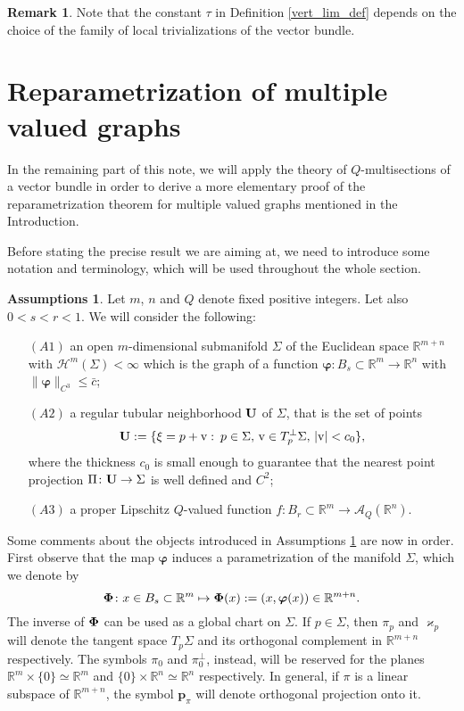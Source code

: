 \documentclass[a4paper,11pt,reqno]{amsart}
\theoremstyle{definition}
\newtheorem{remark}[theorem]{Remark}
\newtheorem{assumptions}[theorem]{Assumptions}
\numberwithin{equation}{section}
\numberwithin{subsection}{section}
\newcommand{\R}{\mathbb{R}}
\newcommand{\A}{\mathcal{A}}
\newcommand{\Ha}{\mathcal{H}}
\newcommand{\bphi}{\boldsymbol{\varphi}}
\newcommand{\p}{\mathbf{p}}
\begin{document}
\begin{remark}
Note that the constant $\tau$ in Definition \ref{vert_lim_def} depends on the choice of the family of local trivializations of the vector bundle. 
\end{remark}

\section{Reparametrization of multiple valued graphs} \label{sec:reparam}

In the remaining part of this note, we will apply the theory of $Q$-multisections of a vector bundle in order to derive a more elementary proof of the reparametrization theorem for multiple valued graphs mentioned in the Introduction.

Before stating the precise result we are aiming at, we need to introduce some notation and terminology, which will be used throughout the whole section.
\begin{assumptions} \label{Ass}
Let $m$, $n$ and $Q$ denote fixed positive integers. Let also $0 < s < r <1$. We will consider the following:
\begin{itemize}
\item[$(A1)$] an open $m$-dimensional submanifold $\Sigma$ of the Euclidean space $\R^{m+n}$ with ${\Ha^{m}(\Sigma) < \infty}$ which is the graph of a function $\bphi \colon B_{s} \subset \R^{m} \to \R^{n}$ with $\| \bphi \|_{C^3} \leq \bar{c}$;
\item[$(A2)$] a regular tubular neighborhood ${\bf U}$ of $\Sigma$, that is the set of points
\begin{equation} \label{tub_neigh}
{\bf U} := \lbrace \xi = p + {\rm v} \, \colon \, p \in \Sigma, \, {\rm v} \in T_{p}^{\perp}\Sigma, \, |{\rm v}| < c_{0} \rbrace,
\end{equation}
where the thickness $c_{0}$ is small enough to guarantee that the nearest point projection $\Pi \colon {\bf U} \to \Sigma$ is well defined and $C^2$;
\item[$(A3)$] a proper Lipschitz $Q$-valued function $f \colon B_{r} \subset \R^{m} \to \A_{Q}(\R^n)$.
\end{itemize}
\end{assumptions}
Some comments about the objects introduced in Assumptions \ref{Ass} are now in order. First observe that the map $\bphi$ induces a parametrization of the manifold $\Sigma$, which we denote by
\begin{equation} \label{parametrization}
{\bf \Phi} \colon x \in B_{s} \subset \R^{m} \mapsto {\bf \Phi}(x) := (x, \bphi(x)) \in \R^{m+n}.
\end{equation}
The inverse of ${\bf \Phi}$ can be used as a global chart on $\Sigma$. If $p \in \Sigma$, then $\pi_{p}$ and $\varkappa_{p}$ will denote the tangent space $T_{p}\Sigma$ and its orthogonal complement in $\R^{m+n}$ respectively. The symbols $\pi_{0}$ and $\pi_{0}^{\perp}$, instead, will be reserved for the planes $\R^{m} \times \{0\} \simeq \R^{m}$ and $\{0\} \times \R^{n} \simeq \R^{n}$ respectively. In general, if $\pi$ is a linear subspace of $\R^{m+n}$, the symbol $\p_{\pi}$ will denote orthogonal projection onto it.   
\end{document}
